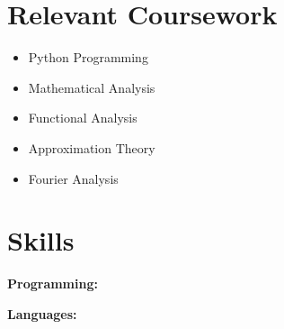 \documentclass[a4paper,11pt]{article}
\newcommand{\resumeItem}[2]{
  \item\small{
    \textbf{#1}{: #2 \vspace{-2pt}}
  }
}
\newcommand{\resumeSubItem}[2]{\resumeItem{#1}{#2}\vspace{-3pt}}
\newcommand{\resumeSubHeadingListStart}{\begin{itemize}[leftmargin=*]}
\newcommand{\resumeSubHeadingListEnd}{\end{itemize}}
\begin{document}
\section{\bfseries{Relevant Coursework}}
\begin{multicols}{4}
    \begin{itemize}
        \item\small Python Programming
        \item\small Mathematical Analysis
        \item \small Functional Analysis
        \item \small Approximation Theory
        \item\small Fourier Analysis
    \end{itemize}
\end{multicols}
\vspace{2pt}
\section{\bfseries{Skills}}

\begin{description}[font=$\bullet$]
    \item   \textbf{Programming:}
    \vspace{2pt}
    \item   \textbf{Languages:}
\end{description}
\end{document}
